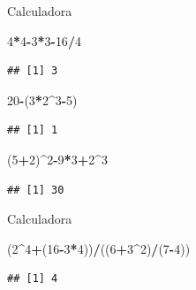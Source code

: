 \documentclass[ignorenonframetext,]{beamer}
\newenvironment{Shaded}{\begin{snugshade}}{\end{snugshade}}
\newcommand{\DecValTok}[1]{\textcolor[rgb]{0.00,0.00,0.81}{#1}}
\newcommand{\OperatorTok}[1]{\textcolor[rgb]{0.81,0.36,0.00}{\textbf{#1}}}
\newcommand{\NormalTok}[1]{#1}
\begin{document}
\begin{frame}[fragile]{Calculadora}

\begin{Shaded}
\begin{Highlighting}[]
\DecValTok{4}\OperatorTok{*}\DecValTok{4}\OperatorTok{-}\DecValTok{3}\OperatorTok{*}\DecValTok{3}\OperatorTok{-}\DecValTok{16}\OperatorTok{/}\DecValTok{4}
\end{Highlighting}
\end{Shaded}

\pause
\begin{verbatim}
## [1] 3
\end{verbatim}

\begin{Shaded}
\begin{Highlighting}[]
\DecValTok{20}\OperatorTok{-}\NormalTok{(}\DecValTok{3}\OperatorTok{*}\DecValTok{2}\OperatorTok{^}\DecValTok{3}\OperatorTok{-}\DecValTok{5}\NormalTok{)}
\end{Highlighting}
\end{Shaded}

\pause
\begin{verbatim}
## [1] 1
\end{verbatim}

\begin{Shaded}
\begin{Highlighting}[]
\NormalTok{(}\DecValTok{5}\OperatorTok{+}\DecValTok{2}\NormalTok{)}\OperatorTok{^}\DecValTok{2}\OperatorTok{-}\DecValTok{9}\OperatorTok{*}\DecValTok{3}\OperatorTok{+}\DecValTok{2}\OperatorTok{^}\DecValTok{3}
\end{Highlighting}
\end{Shaded}

\pause
\begin{verbatim}
## [1] 30
\end{verbatim}

\end{frame}

\begin{frame}[fragile]{Calculadora}

\begin{Shaded}
\begin{Highlighting}[]
\NormalTok{(}\DecValTok{2}\OperatorTok{^}\DecValTok{4}\OperatorTok{+}\NormalTok{(}\DecValTok{16}\OperatorTok{-}\DecValTok{3}\OperatorTok{*}\DecValTok{4}\NormalTok{))}\OperatorTok{/}\NormalTok{((}\DecValTok{6}\OperatorTok{+}\DecValTok{3}\OperatorTok{^}\DecValTok{2}\NormalTok{)}\OperatorTok{/}\NormalTok{(}\DecValTok{7}\OperatorTok{-}\DecValTok{4}\NormalTok{))}
\end{Highlighting}
\end{Shaded}

\pause
\begin{verbatim}
## [1] 4
\end{verbatim}

\end{frame}
\end{document}
